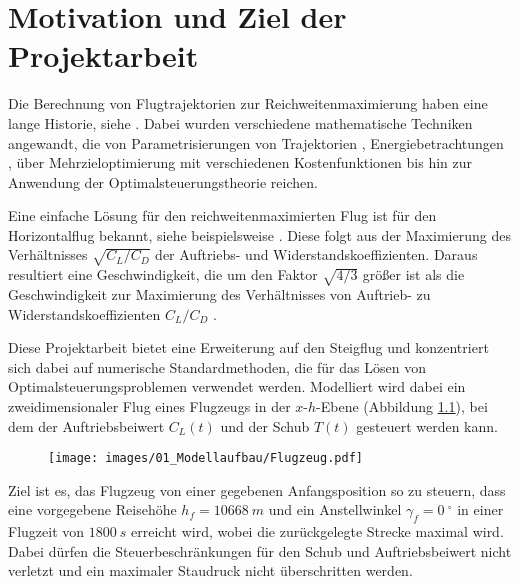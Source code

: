\chapter{Motivation und Ziel der Projektarbeit}
Die Berechnung von Flugtrajektorien zur Reichweitenmaximierung haben eine lange Historie, siehe \cite{Burrows1982, Murrieta2016, Schaback2017, Pierson1989}.  Dabei wurden verschiedene mathematische Techniken angewandt, die von Parametrisierungen von Trajektorien \cite{Burrows1982}, Energiebetrachtungen \cite{Calise1977}, über Mehrzieloptimierung mit verschiedenen Kostenfunktionen \cite{Gardi2016} bis hin zur Anwendung der Optimalsteuerungstheorie \cite{Javier2016}  reichen. 

Eine einfache Lösung für den reichweitenmaximierten Flug ist für den Horizontalflug bekannt, siehe beispielsweise \cite{Peckham1974}. Diese folgt aus der Maximierung des Verhältnisses $\sqrt{C_{L}/C_{D}}$ der Auftriebs- und Widerstandskoeffizienten. Daraus resultiert eine Geschwindigkeit, die um den Faktor $\sqrt{4/3}$ größer ist als die Geschwindigkeit zur Maximierung des Verhältnisses von Auftrieb- zu Widerstandskoeffizienten $C_{L}/C_{D}$ \cite{Schaback2017}. 

Diese Projektarbeit bietet eine Erweiterung auf den Steigflug und konzentriert sich dabei auf numerische Standardmethoden, die für das Lösen von Optimalsteuerungsproblemen verwendet werden. Modelliert wird dabei ein zweidimensionaler Flug eines Flugzeugs in der $x$-$h$-Ebene (Abbildung \ref{img:Flugzeug}), bei dem der Auftriebsbeiwert $C_L(t)$ und der Schub $T(t)$ gesteuert werden kann.

\begin{figure}[H]
    \begin{center}
        \texttt{[image: images/01\_Modellaufbau/Flugzeug.pdf]}
        \label{img:Flugzeug}
    \end{center}
\end{figure}

Ziel ist es, das Flugzeug von einer gegebenen Anfangsposition so zu steuern, dass eine vorgegebene Reisehöhe $h_f = 10668\ m$ und ein Anstellwinkel $\gamma_f = 0\ ^{\circ}$ in einer Flugzeit von $1800 \ s$ erreicht  wird, wobei die zurückgelegte Strecke maximal wird. Dabei dürfen die Steuerbeschränkungen für den Schub und Auftriebsbeiwert nicht verletzt und ein maximaler Staudruck nicht überschritten werden. 

